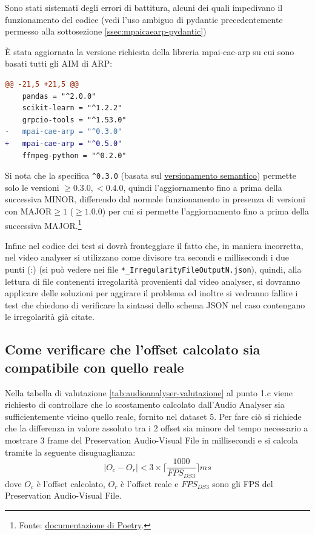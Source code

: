 Sono stati sistemati degli errori di battitura, alcuni dei quali impedivano il funzionamento del codice (vedi l'uso ambiguo di pydantic precedentemente permesso alla sottosezione \ref{ssec:mpaicaearp-pydantic})

È stata aggiornata la versione richiesta della libreria mpai-cae-arp su cui sono basati tutti gli \ac{AIM} di \ac{ARP}:
\begin{lstlisting}[language=diff, caption={Aggiornamento della libreria \texttt{mpai-cae-arp} in Audio Analyser, \texttt{pyproject.toml}}]
@@ -21,5 +21,5 @@ 
    pandas = "^2.0.0"
    scikit-learn = "^1.2.2"
    grpcio-tools = "^1.53.0"
-   mpai-cae-arp = "^0.3.0"
+   mpai-cae-arp = "^0.5.0"
    ffmpeg-python = "^0.2.0"
\end{lstlisting}
Si nota che la specifica \verb|^0.3.0| (basata sul \href{https://semver.org/lang/it/}{versionamento semantico}) permette solo le versioni $\ge0.3.0, <0.4.0$, quindi l'aggiornamento fino a prima della successiva MINOR, differendo dal normale funzionamento in presenza di versioni con MAJOR$\ge1$ ($\ge1.0.0$) per cui si permette l'aggiornamento fino a prima della successiva MAJOR.\footnote{Fonte: \href{https://python-poetry.org/docs/dependency-specification/\#caret-requirements}{documentazione di Poetry}.}

Infine nel codice dei test si dovrà fronteggiare il fatto che, in maniera incorretta, nel video analyser si utilizzano come divisore tra secondi e millisecondi i due punti (:) (si può vedere nei file \verb|*_IrregularityFileOutputN.json|), quindi, alla lettura di file contenenti irregolarità provenienti dal video analyser, si dovranno applicare delle soluzioni per aggirare il problema ed inoltre si vedranno fallire i test che chiedono di verificare la sintassi dello schema JSON nel caso contengano le irregolarità già citate.


\subsection{Come verificare che l'offset calcolato sia compatibile con quello reale} \label{ssec:audioanalyser-offset}   %
Nella tabella di valutazione \ref{tab:audioanalyser-valutazione} al punto 1.c viene richiesto di controllare che lo scostamento calcolato dall'Audio Analyser sia sufficientemente vicino quello reale, fornito nel dataset 5.
Per fare ciò si richiede che la differenza in valore assoluto tra i 2 offset sia minore del tempo necessario a mostrare 3 frame del Preservation Audio-Visual File in millisecondi e si calcola tramite la seguente disuguaglianza:
\begin{equation}
    |O_c - O_r| < 3 \times \big\lceil\frac{1000}{FPS_{DS3}}\big\rceil ms
\end{equation}
dove $O_c$ è l'offset calcolato, $O_r$ è l'offset reale e $FPS_{DS3}$ sono gli FPS del Preservation Audio-Visual File.

